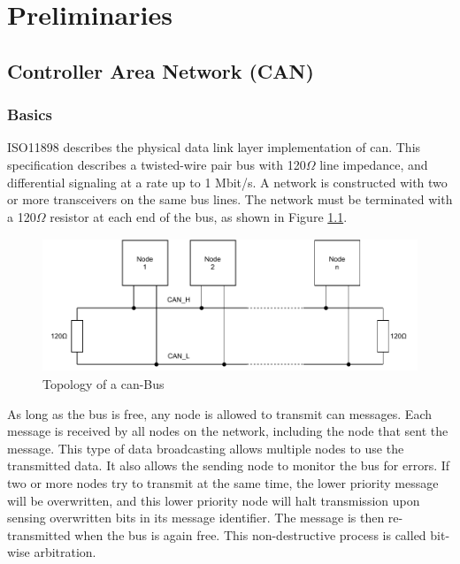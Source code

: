 \chapter{Preliminaries}




\section{Controller Area Network (CAN)}
\subsection{Basics}
ISO11898 describes the physical data link layer implementation of \acrshort{can}. This specification describes a twisted-wire pair bus with 120$\Omega$ line impedance, and differential signaling at a rate up to 1 Mbit/s. A network is constructed with two or more transceivers on the same bus lines. The network must be terminated with a 120$\Omega$ resistor at each end of the bus, as shown in Figure \ref{fig:can-bus_topology}.


\begin{figure}[h!]
	\centering
	\includegraphics[height=4cm]{images/can-bus_topology}
	\caption{Topology of a \acrshort{can}-Bus}
	\vspace{-1.4ex}
	\label{fig:can-bus_topology}
\end{figure}

As long as the bus is free, any node is allowed to transmit \acrshort{can} messages. Each message is received by all nodes on the network, including the node that sent the message. This type of data broadcasting allows multiple nodes to use the transmitted data. It also allows the sending node to monitor the bus for errors. If two or more nodes try to transmit at the same time, the lower priority message will be overwritten, and this lower priority node will halt transmission upon sensing overwritten bits in its message identifier. The message is then re-transmitted when the bus is again free. This non-destructive process is called bit-wise arbitration.

